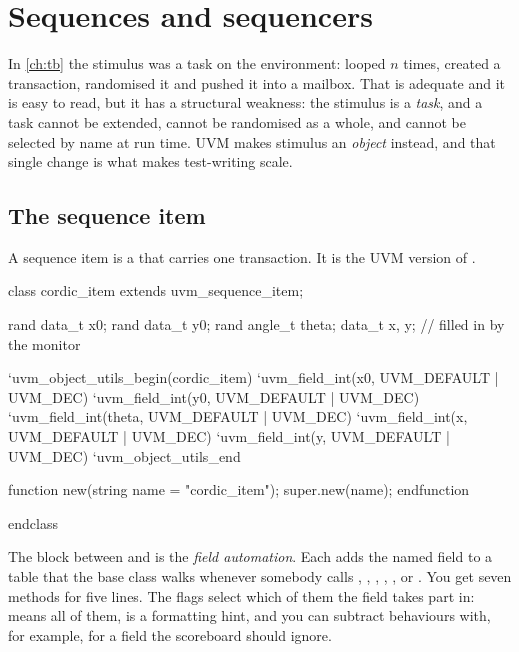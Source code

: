 \section{Sequences and sequencers}
\label{sec:uvm:sequences}

%
In \cref{ch:tb} the stimulus was a task on the environment:
 looped $n$ times, created a transaction, randomised it
and pushed it into a mailbox. That is adequate and it is easy to read, but it
has a structural weakness: the stimulus is a \emph{task}, and a task cannot
be extended, cannot be randomised as a whole, and cannot be selected by name
at run time. UVM makes stimulus an \emph{object} instead, and that single
change is what makes test-writing scale.

\subsection{The sequence item}

A sequence item is a  that carries one transaction. It is
the UVM version of .

\begin{uvmcode}[caption={A sequence item with field automation},label={lst:uvm:item-macros}]
class cordic_item extends uvm_sequence_item;

  rand data_t  x0;
  rand data_t  y0;
  rand angle_t theta;
  data_t       x, y;        // filled in by the monitor

  `uvm_object_utils_begin(cordic_item)
    `uvm_field_int(x0,    UVM_DEFAULT | UVM_DEC)
    `uvm_field_int(y0,    UVM_DEFAULT | UVM_DEC)
    `uvm_field_int(theta, UVM_DEFAULT | UVM_DEC)
    `uvm_field_int(x,     UVM_DEFAULT | UVM_DEC)
    `uvm_field_int(y,     UVM_DEFAULT | UVM_DEC)
  `uvm_object_utils_end

  function new(string name = "cordic_item");
    super.new(name);
  endfunction

endclass
\end{uvmcode}

%
The block between  and
 is the \emph{field automation}. Each
 adds the named field to a table that the base class
walks whenever somebody calls , , ,
, ,  or . You get
seven methods for five lines. The flags select which of them the field takes
part in:  means all of them,  is a
formatting hint, and you can subtract behaviours with, for example,
 for a field the scoreboard should
ignore.

